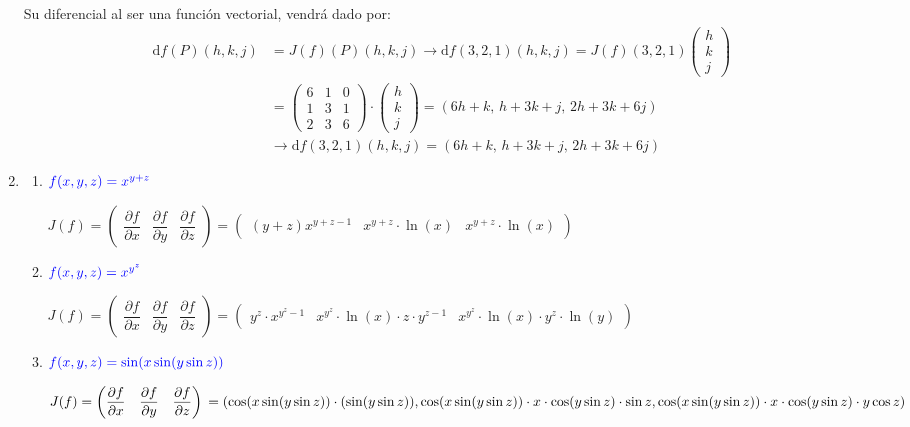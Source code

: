 \begin{enumerate}[label=\c olor{red}\textbf{\arabic*)}, leftmargin=*]
Su diferencial al ser una función vectorial, vendrá dado por:
\[ \begin{aligned}
\mathrm{d}f(P)(h,k,j)&=J(f)(P)(h,k,j)\longrightarrow\mathrm{d}f(3,2,1)(h,k,j)=J(f)(3,2,1)\begin{pmatrix}
h\\
k\\
j
\end{pmatrix}\\
&=\begin{pmatrix}
6 & 1 & 0 \\
1 & 3 & 1 \\
2 & 3 & 6
\end{pmatrix}\cdot\begin{pmatrix}
h\\
k\\
j
\end{pmatrix}=(6h+k,\, h+3k+j,\, 2h+3k+6j)\\
&\longrightarrow \mathrm{d}f(3,2,1)(h,k,j)=(6h+k,\, h+3k+j,\, 2h+3k+6j)
\end{aligned} \]

\item {}
\begin{enumerate}[label=\color{red}\textbf{\alph*)}]
	\item $\textcolor{blue}{f(x,y,z)=x^{y+z}}$
	
	$J(f)=\begin{pmatrix}
	\dfrac{\partial f}{\partial x} & \dfrac{\partial f}{\partial y} & \dfrac{\partial f}{\partial z}
	\end{pmatrix}=\begin{pmatrix}
	(y+z)x^{y+z-1} & x^{y+z}\cdot\ln(x) & x^{y+z}\cdot\ln(x)
	\end{pmatrix}$
	
	\item $\textcolor{blue}{f(x,y,z)=x^{y^{z}}}$
	
	$J(f)=\begin{pmatrix}
		\dfrac{\partial f}{\partial x} & \dfrac{\partial f}{\partial y} & \dfrac{\partial f}{\partial z}
		\end{pmatrix}=\begin{pmatrix}
		y^{z}\cdot x^{y^{z}-1} & x^{y^{z}}\cdot\ln(x)\cdot z\cdot y^{z-1} & x^{y^{z}}\cdot\ln(x)\cdot y^{z}\cdot\ln(y)
		\end{pmatrix}$
		
	\item $\textcolor{blue}{f(x,y,z)=\sin(x\sin(y\sin z))}$
	
	$J(f)=\begin{pmatrix}
			\dfrac{\partial f}{\partial x} & \dfrac{\partial f}{\partial y} & \dfrac{\partial f}{\partial z}
			\end{pmatrix}\\=
			\left(\cos(x\sin(y\sin z))\cdot(\sin(y\sin z)), \cos(x\sin(y\sin z))\cdot x\cdot\cos(y\sin z)\cdot\sin z , \cos(x\sin(y\sin z))\cdot x\cdot \cos(y\sin z)\cdot y\cos z\right)$
			

\end{enumerate}
\end{enumerate}
